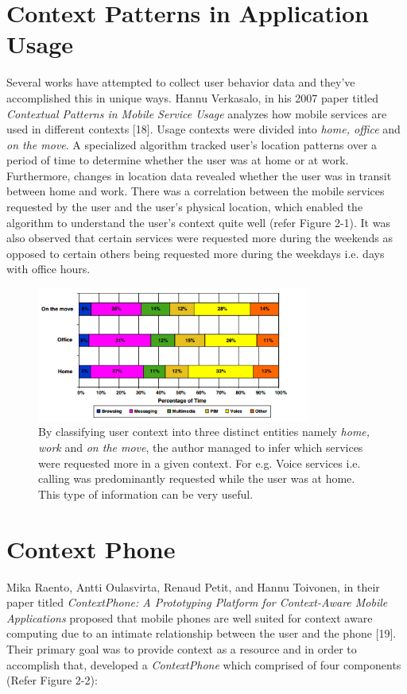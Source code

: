 \documentclass[12pt]{uthesis-v12}  %
\begin{document}
	\section{Context Patterns in Application Usage}
		Several works have attempted to collect user behavior data and they've accomplished this in unique ways. Hannu Verkasalo, in his 2007 paper titled {\em Contextual Patterns in Mobile Service Usage} analyzes how mobile services are used in different contexts [18]. Usage contexts were divided into {\em home, office} and {\em on the move}. A specialized algorithm tracked user's location patterns over a period of time to determine whether the user was at home or at work. Furthermore, changes in location data revealed whether the user was in transit between home and work. There was a correlation between the mobile services requested by the user and the user's physical location, which enabled the algorithm to understand the user's context quite well (refer Figure 2-1). It was also observed that certain services were requested more during the weekends as opposed to certain others being requested more during the weekdays i.e. days with office hours.  
		
		\begin{figure}[!ht]
			\centering
			\includegraphics[width = 90mm]{images/appsByTime.png}
			\caption[Mobile Services Requested At Various Times Of Day]
			{By classifying user context into three distinct entities namely {\em home, work} and {\em on the move}, the author managed to infer which services were requested more in a given context. For e.g. Voice services i.e. calling was predominantly requested while the user was at home. This type of information can be very useful.}
		\end{figure}
	
	\section{Context Phone}
		Mika Raento, Antti Oulasvirta, Renaud Petit, and Hannu Toivonen, in their paper titled {\em ContextPhone: A Prototyping Platform for Context-Aware Mobile Applications} proposed that mobile phones are well suited for context aware computing due to an intimate relationship between the user and the phone [19]. Their primary goal was to provide context as a resource and in order to accomplish that, developed a {\em ContextPhone} which comprised of four components (Refer Figure 2-2):
		
\end{document}
